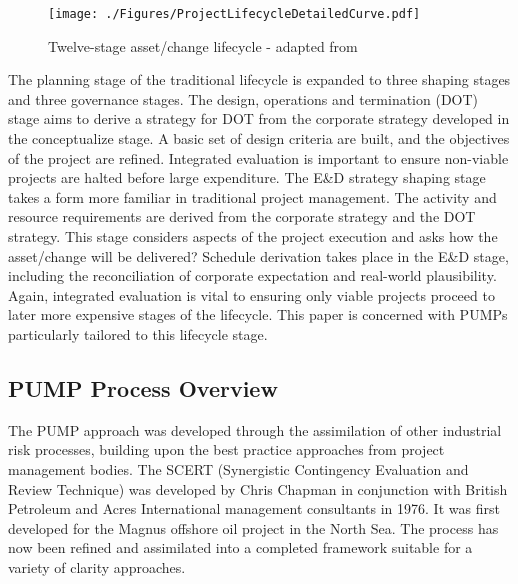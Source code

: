 \begin{figure}[!h]
  \centering
    \texttt{[image: ./Figures/ProjectLifecycleDetailedCurve.pdf]} 
\caption{Twelve-stage asset/change lifecycle - adapted from \cite{chapman}}
\label{Figure:Project_Lifecycle}
\end{figure}

The planning stage of the traditional lifecycle is expanded to three shaping stages and three governance stages.
The design, operations and termination (DOT) stage aims to derive a strategy for DOT from the corporate strategy developed in the conceptualize stage.
A basic set of design criteria are built, and the objectives of the project are refined. 
Integrated evaluation is important to ensure non-viable projects are halted before large expenditure.
The E\&D strategy shaping stage takes a form more familiar in traditional project management.
The activity and resource requirements are derived from the corporate strategy and the DOT strategy.
This stage considers aspects of the project execution and asks how the asset/change will be delivered?
Schedule derivation takes place in the E\&D stage, including the reconciliation of corporate expectation and real-world plausibility.
Again, integrated evaluation is vital to ensuring only viable projects proceed to later more expensive stages of the lifecycle.
This paper is concerned with PUMPs particularly tailored to this lifecycle stage.



\subsection{PUMP Process Overview}

The PUMP approach was developed through the assimilation of other industrial risk processes, building upon the best practice approaches from project management bodies.
The SCERT (Synergistic Contingency Evaluation and Review Technique) was developed by Chris Chapman in conjunction with British Petroleum and Acres International management consultants in 1976.
It was first developed for the Magnus offshore oil project in the North Sea. 
The process has now been refined and assimilated into a completed framework suitable for a variety of clarity approaches.

